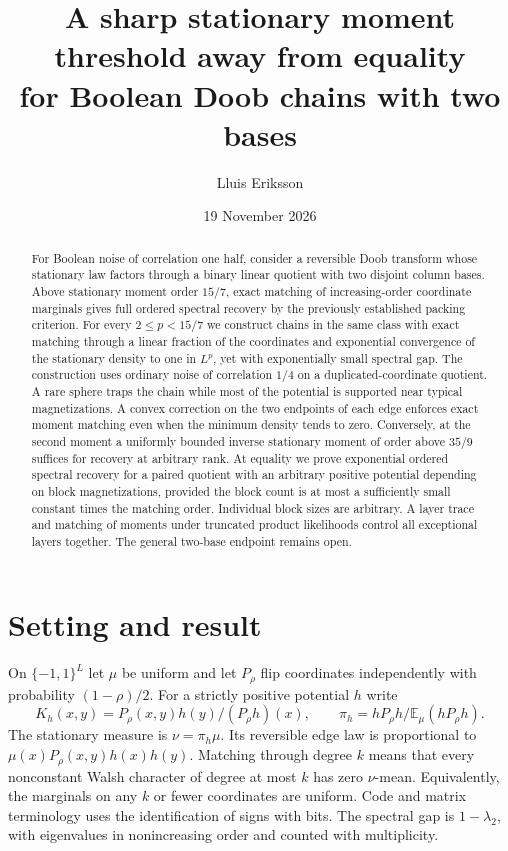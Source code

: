 \documentclass[11pt]{article}
\title{A sharp stationary moment threshold away from equality\\for Boolean Doob chains with two bases}
\author{Lluis Eriksson}
\date{19 November 2026}
\newcommand{\E}{\mathbb E}
\begin{document}
\maketitle
\begin{abstract}
For Boolean noise of correlation one half, consider a reversible Doob transform whose stationary law factors through a binary linear quotient with two disjoint column bases. Above stationary moment order $15/7$, exact matching of increasing-order coordinate marginals gives full ordered spectral recovery by the previously established packing criterion. For every $2\le p<15/7$ we construct chains in the same class with exact matching through a linear fraction of the coordinates and exponential convergence of the stationary density to one in $L^p$, yet with exponentially small spectral gap. The construction uses ordinary noise of correlation $1/4$ on a duplicated-coordinate quotient. A rare sphere traps the chain while most of the potential is supported near typical magnetizations. A convex correction on the two endpoints of each edge enforces exact moment matching even when the minimum density tends to zero. Conversely, at the second moment a uniformly bounded inverse stationary moment of order above $35/9$ suffices for recovery at arbitrary rank. At equality we prove exponential ordered spectral recovery for a paired quotient with an arbitrary positive potential depending on block magnetizations, provided the block count is at most a sufficiently small constant times the matching order. Individual block sizes are arbitrary. A layer trace and matching of moments under truncated product likelihoods control all exceptional layers together. The general two-base endpoint remains open.
\end{abstract}

\section{Setting and result}
On $\{-1,1\}^L$ let $\mu$ be uniform and let $P_\rho$ flip coordinates independently with probability $(1-\rho)/2$. For a strictly positive potential $h$ write
\[
 K_h(x,y)=P_\rho(x,y)h(y)/(P_\rho h)(x),\qquad
 \pi_h=hP_\rho h/\E_\mu(hP_\rho h).
\]
The stationary measure is $\nu=\pi_h\mu$. Its reversible edge law is proportional to $\mu(x)P_\rho(x,y)h(x)h(y)$. Matching through degree $k$ means that every nonconstant Walsh character of degree at most $k$ has zero $\nu$-mean. Equivalently, the marginals on any $k$ or fewer coordinates are uniform. Code and matrix terminology uses the identification of signs with bits. The spectral gap is $1-\lambda_2$, with eigenvalues in nonincreasing order and counted with multiplicity.
\end{document}
